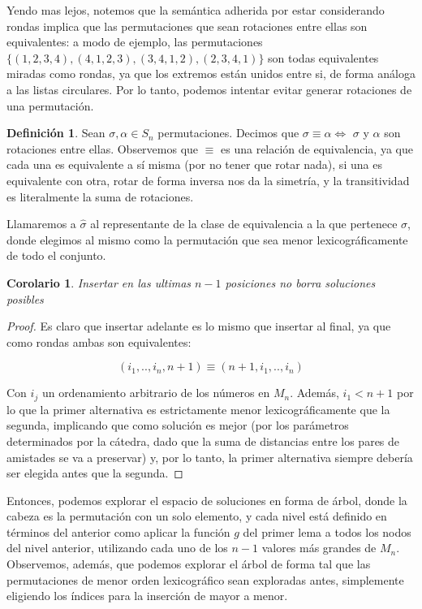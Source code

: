 \documentclass{article}
\newtheorem{corollary}{Corolario}[theorem]
\theoremstyle{definition}
\newtheorem{definition}{Definición}[section]
\theoremstyle{remark}
\begin{document}
Yendo mas lejos, notemos que la semántica adherida por estar considerando rondas implica que las permutaciones que sean rotaciones entre ellas son equivalentes: a modo de ejemplo, las permutaciones $\{(1, 2, 3, 4), (4, 1, 2, 3), (3, 4, 1, 2), (2, 3, 4, 1)\}$ son todas equivalentes miradas como rondas, ya que los extremos están unidos entre si, de forma análoga a las listas circulares. Por lo tanto, podemos intentar evitar generar rotaciones de una permutación.

\begin{definition}
Sean $\sigma, \alpha \in S_n$ permutaciones. Decimos que $\sigma \equiv \alpha \iff$ $\sigma$ y $\alpha$ son rotaciones entre ellas. Observemos que $\equiv$ es una relación de equivalencia, ya que cada una es equivalente a sí misma (por no tener que rotar nada), si una es equivalente con otra, rotar de forma inversa nos da la simetría, y la transitividad es literalmente la suma de rotaciones.

Llamaremos a $\hat{\sigma}$ al representante de la clase de equivalencia a la que pertenece $\sigma$, donde elegimos al mismo como la permutación que sea menor lexicográficamente de todo el conjunto.
\end{definition}

\begin{corollary}
Insertar en las ultimas $n-1$ posiciones no borra soluciones posibles
\end{corollary}

\begin{proof}
Es claro que insertar adelante es lo mismo que insertar al final, ya que como rondas ambas son equivalentes:

$$(i_1, .., i_n, n+1) \equiv (n+1, i_1, .., i_n)$$

Con $i_j$ un ordenamiento arbitrario de los números en $M_n$. Además, $i_1 < n+1$ por lo que la primer alternativa es estrictamente menor lexicográficamente que la segunda, implicando que como solución es mejor (por los parámetros determinados por la cátedra, dado que la suma de distancias entre los pares de amistades se va a preservar) y, por lo tanto, la primer alternativa siempre debería ser elegida antes que la segunda.
\end{proof}

Entonces, podemos explorar el espacio de soluciones en forma de árbol, donde la cabeza es la permutación con un solo elemento, y cada nivel está definido en términos del anterior como aplicar la función $g$ del primer lema a todos los nodos del nivel anterior, utilizando cada uno de los $n-1$ valores más grandes de $M_n$. Observemos, además, que podemos explorar el árbol de forma tal que las permutaciones de menor orden lexicográfico sean exploradas antes, simplemente eligiendo los índices para la inserción de mayor a menor.
\end{document}
